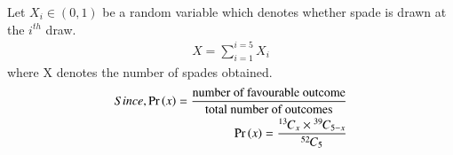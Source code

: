 Let $X_{i} \in (0,1)$ be a random variable which denotes whether spade is drawn at the $i^{th}$ draw.\\
   \begin{align}  
      X=\sum_{i=1}^{i=5}X_{i} 
      \end{align}
     where X denotes the number of spades obtained. \\
    \begin{align}
     Since, \Pr\left(x\right)=\frac{ \text{number of favourable outcome}}{\text{total number of outcomes}} \notag \\
      \Pr\left(x\right)=\frac{{{}^{13}\mkern-1muC_{x}}\times {{}^{39}\mkern-1muC_{5-x}}}{{{}^{52}\mkern-1muC_{5}}} \label{5.8-1:2.0.2}
      \end{align}
      

\begin{table}[h]
\caption{Probabilities of each case }    \label{5.8-1:tab:my_label}
\end{table}